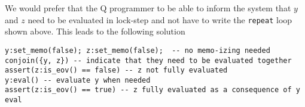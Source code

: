 We would prefer that the Q programmer to be able to
inform the system that \(y\) and \(z\) need to be evaluated in lock-step 
and not have to write the {\tt repeat} loop shown above. This leads to the
following solution

\begin{verbatim}
y:set_memo(false); z:set_memo(false);  -- no memo-izing needed
conjoin({y, z}) -- indicate that they need to be evaluated together
assert(z:is_eov() == false) -- z not fully evaluated
y:eval() -- evaluate y when needed
assert(z:is_eov() == true) -- z fully evaluated as a consequence of y eval
\end{verbatim}
